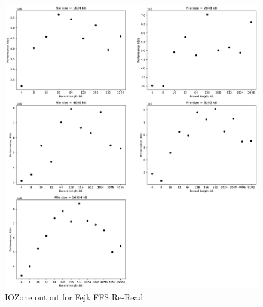 \begin{figure}[!htb]
	\label{fig:app_bench_fffs_re_read}
	\begin{center}
		\includegraphics[width=1.0\textwidth]{figures/benchmarking/fake-ffs/Re-Read.pdf}
	\end{center}
	\caption{IOZone output for Fejk FFS Re-Read}
\end{figure}

